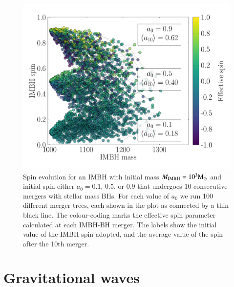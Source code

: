 \documentclass[article]{aa}
\newcommand{\Ms}{{\rm M}_\odot}
\newcommand{\ibh}{{\rm IMBH}}
\begin{document}
\begin{figure}
\centering
\includegraphics[width=\columnwidth]{track1000}
\caption{Spin evolution for an IMBH with initial mass $M_\ibh = 10^3\Ms$ and initial spin either $a_0 = 0.1$, $0.5$, or $0.9$ that undergoes 10 consecutive mergers with stellar mass BHs. For each value of $a_0$ we run 100 different merger trees, each shown in the plot
as connected by a thin black line. The colour-coding marks the effective spin parameter calculated at each IMBH-BH merger. The labels  show the initial value of the IMBH spin adopted, and the average value of the spin after the 10th merger. }
\label{fig:f11b}
\end{figure}


\section{Gravitational waves}
\label{gra}
\end{document}
